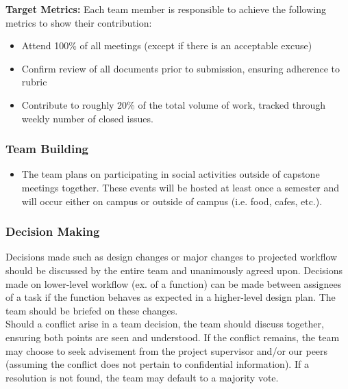 \documentclass{article}
\begin{document}
\noindent\textbf{Target Metrics:}
Each team member is responsible to achieve the following metrics to show their contribution:
\begin{itemize}
  \item Attend 100\% of all meetings (except if there is an acceptable excuse)
  \item Confirm review of all documents prior to submission, ensuring adherence to rubric
  \item Contribute to roughly 20\% of the total volume of work, tracked through weekly number of closed issues.
\end{itemize}


\subsubsection*{Team Building}

\begin{itemize}
  \item The team plans on participating in social activities outside of capstone meetings together. These events will be hosted at least once a semester and will occur either on campus or outside of campus (i.e. food, cafes, etc.).  
\end{itemize}  


\subsubsection*{Decision Making} 

Decisions made such as design changes or major changes to projected workflow should be discussed by the entire team and unanimously agreed upon. Decisions made on lower-level workflow (ex. of a function) can be made between assignees of a task if the function behaves as expected in a higher-level design plan. The team should be briefed on these changes.  \\

Should a conflict arise in a team decision, the team should discuss together, ensuring both points are seen and understood. If the conflict remains, the team may choose to seek advisement from the project supervisor and/or our peers (assuming the conflict does not pertain to confidential information). If a resolution is not found, the team may default to a majority vote.   
\end{document}
